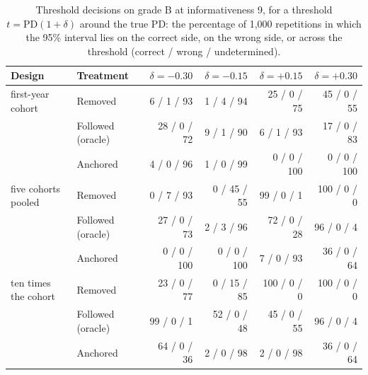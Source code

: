 \begin{table}[htbp]
\centering
\footnotesize
\caption{Threshold decisions on grade B at informativeness 9, for a threshold $t=\mathrm{PD}(1+\delta)$ around the true PD: the percentage of 1,000 repetitions in which the 95\% interval lies on the correct side, on the wrong side, or across the threshold (correct / wrong / undetermined).}
\label{tab:decisions}
\begin{tabular}{llrrrr}
\toprule
Design & Treatment & $\delta=-0.30$ & $\delta=-0.15$ & $\delta=+0.15$ & $\delta=+0.30$ \\
\midrule
first-year cohort & Removed & 6 / 1 / 93 & 1 / 4 / 94 & 25 / 0 / 75 & 45 / 0 / 55 \\
 & Followed (oracle) & 28 / 0 / 72 & 9 / 1 / 90 & 6 / 1 / 93 & 17 / 0 / 83 \\
 & Anchored & 4 / 0 / 96 & 1 / 0 / 99 & 0 / 0 / 100 & 0 / 0 / 100 \\
five cohorts pooled & Removed & 0 / 7 / 93 & 0 / 45 / 55 & 99 / 0 / 1 & 100 / 0 / 0 \\
 & Followed (oracle) & 27 / 0 / 73 & 2 / 3 / 96 & 72 / 0 / 28 & 96 / 0 / 4 \\
 & Anchored & 0 / 0 / 100 & 0 / 0 / 100 & 7 / 0 / 93 & 36 / 0 / 64 \\
ten times the cohort & Removed & 23 / 0 / 77 & 0 / 15 / 85 & 100 / 0 / 0 & 100 / 0 / 0 \\
 & Followed (oracle) & 99 / 0 / 1 & 52 / 0 / 48 & 45 / 0 / 55 & 96 / 0 / 4 \\
 & Anchored & 64 / 0 / 36 & 2 / 0 / 98 & 2 / 0 / 98 & 36 / 0 / 64 \\
\bottomrule
\end{tabular}
\end{table}
